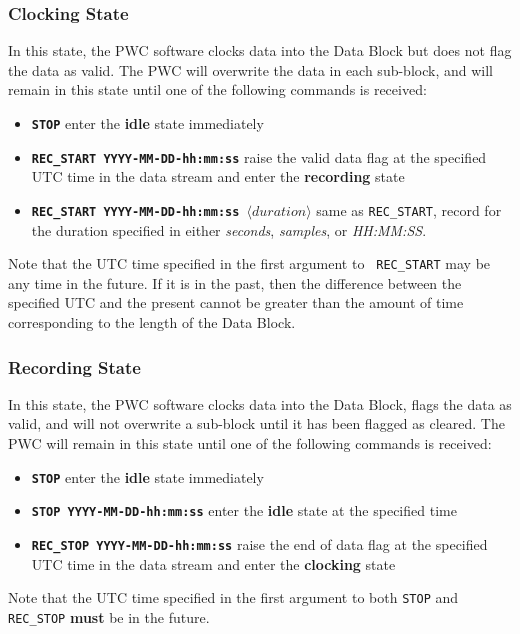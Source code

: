 \subsubsection{Clocking State}

In this state, the PWC software clocks data into the Data Block but
does not flag the data as valid.  The PWC will overwrite the data in
each sub-block, and will remain in this state until one of the
following commands is received:
\begin{itemize}
\item {\tt\bf STOP} enter the {\bf idle} state immediately
\item {\tt\bf REC\_START YYYY-MM-DD-hh:mm:ss} raise the valid data flag
	at the specified UTC time in the data stream and enter the {\bf
	recording} state
\item {\tt\bf REC\_START YYYY-MM-DD-hh:mm:ss $\langle duration\rangle$} same 
	as {\tt REC\_START}, record for the duration specified in either
	{\it seconds}, {\it samples}, or {\it HH:MM:SS}.
\end{itemize}
Note that the UTC time specified in the first argument to {\tt
REC\_START} may be any time in the future.  If it is in the past, then
the difference between the specified UTC and the present cannot be
greater than the amount of time corresponding to the length of the
Data Block.

\subsubsection{Recording State}

In this state, the PWC software clocks data into the Data Block, flags
the data as valid, and will not overwrite a sub-block until it has
been flagged as cleared.  The PWC will remain in this state until one
of the following commands is received:

\begin{itemize}
\item {\tt\bf STOP} enter the {\bf idle} state immediately
\item {\tt\bf STOP YYYY-MM-DD-hh:mm:ss} enter the {\bf idle} state
	at the specified time
\item {\tt\bf REC\_STOP YYYY-MM-DD-hh:mm:ss} raise the end of data flag
	at the specified UTC time in the data stream and enter the {\bf
	clocking} state
\end{itemize}

Note that the UTC time specified in the first argument to both {\tt STOP}
and {\tt REC\_STOP} {\bf must} be in the future.


